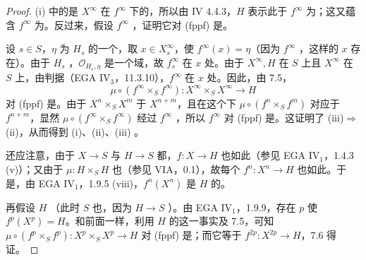 \begin{proof}
(i) 中的是 $X^\infty$ 在 $f^\infty$ 下的，所以由 IV 4.4.3，$H$ 表示此于 $f^\infty$ 为；这又蕴含 $f^\infty$ 为。反过来，假设 $f^\infty$ ，证明它对 (fppf) 是。

设 $s\in S$，$\eta$ 为 $H_s$ 的一个，取 $x\in X_s^\infty$，使 $f^\infty(x)=\eta$（因为 $f^\infty$ ，这样的 $x$ 存在）。由于 $H_s$ ，$\mathscr O_{H_s,\eta}$ 是一个域，故 $f_s^\infty$ 在 $x$ 处。由于 $X^\infty,H$ 在 $S$ 上且 $X^\infty$ 在 $S$ 上，由判据（EGA $\mathrm{IV}_3$，11.3.10），$f^\infty$ 在 $x$ 处。因此，由 7.5，
\[
\mu\circ(f^\infty\times_S f^\infty):X^\infty\times_S X^\infty\longrightarrow H
\]
对 (fppf) 是。由于 $X^n\times_S X^m$ 于 $X^{n+m}$，且在这个下 $\mu\circ(f^n\times_S f^m)$ 对应于 $f^{n+m}$，显然 $\mu\circ(f^\infty\times_S f^\infty)$ 经过 $f^\infty$ ，所以 $f^\infty$ 对 (fppf) 是。这证明了 (iii)$\Rightarrow$(ii)，从而得到 (i)、(ii)、(iii) 。

还应注意，由于 $X\to S$ 与 $H\to S$ 都，$f:X\to H$ 也如此（参见 EGA $\mathrm{IV}_1$，1.4.3 (v)）；又由于 $\mu:H\times_S H$ 也（参见 VIA，0.1），故每个 $f^n:X^n\to H$ 也如此。于是，由 EGA $\mathrm{IV}_1$，1.9.5 (viii)，$f^n(X^n)$ 是 $H$ 的。

再假设 $H$ （此时 $S$ 也，因为 $H\to S$ ）。由 EGA $\mathrm{IV}_1$，1.9.9，存在 $p$ 使 $f^p(X^p)=H$。和前面一样，利用 $H$ 的这一事实及 7.5，可知 $\mu\circ(f^p\times_S f^p):X^p\times_S X^p\to H$ 对 (fppf) 是；而它等于 $f^{2p}:X^{2p}\to H$，7.6 得证。
\end{proof}

